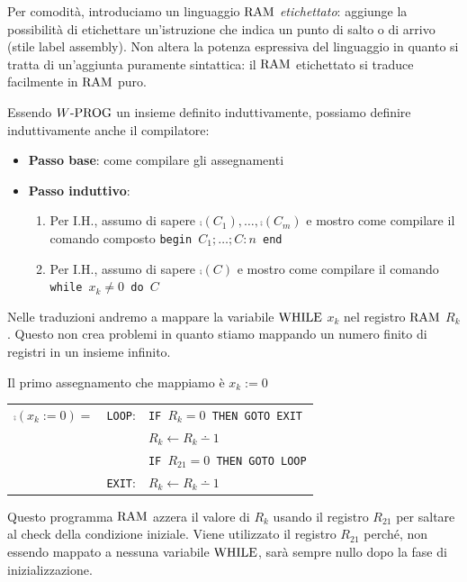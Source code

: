 Per comodità, introduciamo un linguaggio $\text{RAM}$ \textit{etichettato}: aggiunge la possibilità di etichettare un'istruzione che indica un punto di salto o di arrivo (stile label assembly). Non altera la potenza espressiva del linguaggio in quanto si tratta di un'aggiunta puramente sintattica: il $\text{RAM}$ etichettato si traduce facilmente in $\text{RAM}$ puro.

Essendo $W\text{-PROG}$ un insieme definito induttivamente, possiamo definire induttivamente anche il compilatore:
\begin{itemize}
	\item \textbf{Passo base}: come compilare gli assegnamenti
	\item \textbf{Passo induttivo}:
	\begin{enumerate}
		\item Per I.H., assumo di sapere $\comp(C_1), \dots, \comp(C_m)$ e mostro come compilare il comando composto \texttt{begin $C_1; \dots; C:n$ end}
		\item Per I.H., assumo di sapere $\comp(C)$ e mostro come compilare il comando \texttt{while $x_k \neq 0$ do $C$}
	\end{enumerate}
\end{itemize}

Nelle traduzioni andremo a mappare la variabile $\text{WHILE}$ $x_k$ nel registro $\text{RAM}$ $R_k$. Questo non crea problemi in quanto stiamo mappando un numero finito di registri in un insieme infinito.

Il primo assegnamento che mappiamo è $x_k := 0$
\begin{center}
	\renewcommand{\arraystretch}{1.25}
	\begin{tabular}{l|r l|}
		\cline{2-3}
		$\comp(x_k:=0) =$ & \texttt{LOOP}:& \texttt{IF $R_k = 0$ THEN GOTO EXIT}\\
		&& $R_k\leftarrow R_k \dotminus 1$ \\
		&& \texttt{IF $R_{21} = 0$ THEN GOTO LOOP} \\
		&\texttt{EXIT}:& $R_k \leftarrow R_k \dotminus 1$ \\
		\cline{2-3}
	\end{tabular}\vspace{.15cm}
\end{center}

Questo programma $\text{RAM}$ azzera il valore di $R_k$ usando il registro $R_{21}$ per saltare al check della condizione iniziale. Viene utilizzato il registro $R_{21}$ perché, non essendo mappato a nessuna variabile $\text{WHILE}$, sarà sempre nullo dopo la fase di inizializzazione.

